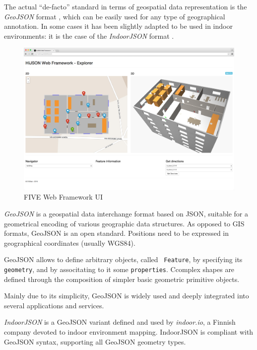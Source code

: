The actual ``de-facto'' standard in terms of geospatial data representation is
the \emph{GeoJSON} format \cite{geojson}, which can be easily used for any type of geographical
annotation. In some cases it has been slightly adapted to be used in indoor
environments: it is the case of the \emph{IndoorJSON} format \cite{indoorjson}.



\begin{figure}[t!]
\centering
\includegraphics[width=\textwidth]{images/web_framework_2.png}
\caption{FIVE Web Framework UI}
\label{fig:web-framework-ui}
\end{figure}




\emph{GeoJSON} is a geospatial data interchange format based on JSON, suitable for a
geometrical encoding of various geographic data structures. As opposed to GIS
formats, GeoJSON is an open standard. Positions need to be expressed in
geographical coordinates (usually WGS84).

GeoJSON \cite{geojson} allows to define arbitrary objects, called {\tt
Feature}, by specifying its {\tt geometry}, and by associtating to it some
{\tt properties}. Ccomplex shapes are defined through the composition of
simpler  basic geometric primitive objects. 

Mainly due to its simplicity,
GeoJSON is widely used and deeply integrated into several applications and
services.

\emph{IndoorJSON} \cite{indoorjson} is a GeoJSON variant defined and used by \emph{indoor.io}, a
Finnish company devoted to indoor environment mapping. IndoorJSON is compliant
with GeoJSON syntax, supporting all GeoJSON geometry types.

